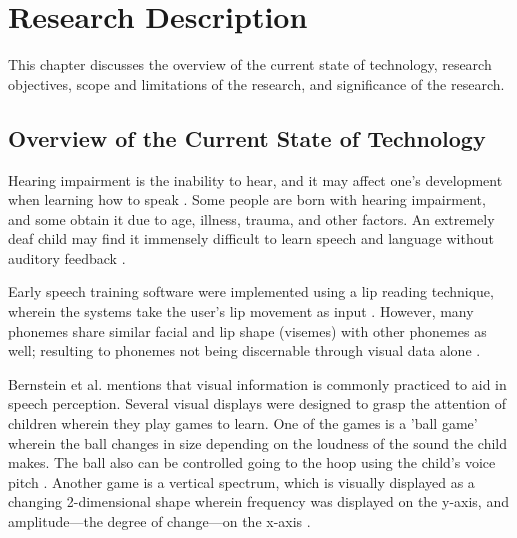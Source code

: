 \chapter{Research Description}
\label{sec:researchdesc}

This chapter discusses the overview of the current state of technology, research objectives, scope and limitations of the research, and significance of the research.

\section{Overview of the Current State of Technology}
\label{sec:overview}

Hearing impairment is the inability to hear, and it may affect one's development when learning how to speak \cite{lasak:2014:HL}. Some people are born with hearing impairment, and some obtain it due to age, illness, trauma, and other factors. An extremely deaf child may find it immensely difficult to learn speech and language without auditory feedback \cite{bernstein:1988:STA}.

\begin{comment}
Throughout the years, man has tried to find ways to help the hearing-handicapped learn how to speak properly \cite{oyer:1976:CHH}. Oyer \citeyear{oyer:1976:CHH} states that there was a time when hearing-handicapped were considered unfit to hold citizenship. James Pickett, a professor of speech communication research says "I believe that large improvements in the lives of deaf persons depends on making large improvements in their speech communication" \cite{connor:1971:SDC}. Pickett also states that in the late 19th century, research began for helping the Deaf communicate \cite{connor:1971:SDC}.

One problem of a hearing-impaired student is the lack of access to speech training aids outside of therapy \cite{bernstein:1988:STA}. Extensive practice is required for the student to progress \cite{bernstein:1988:STA}.
\end{comment}

Early speech training software were implemented using a lip reading technique, wherein the systems take the user's lip movement as input \cite{heracleous:2010:CSA}. However, many phonemes share similar facial and lip shape (visemes) with other phonemes as well; resulting to phonemes not being discernable through visual data alone \cite{heracleous:2010:CSA}.

Bernstein et al. \citeyear{bernstein:1988:STA} mentions that visual information is commonly practiced to aid in speech perception. Several visual displays were designed to grasp the attention of children wherein they play games to learn. One of the games is a 'ball game' wherein the ball changes in size depending on the loudness of the sound the child makes. The ball also can be controlled going to the hoop using the child's voice pitch \cite{bernstein:1988:STA}. Another game is a vertical spectrum, which is visually displayed as a changing 2-dimensional shape wherein frequency was displayed on the y-axis, and amplitude—the degree of change—on the x-axis \cite{bernstein:1988:STA}.

